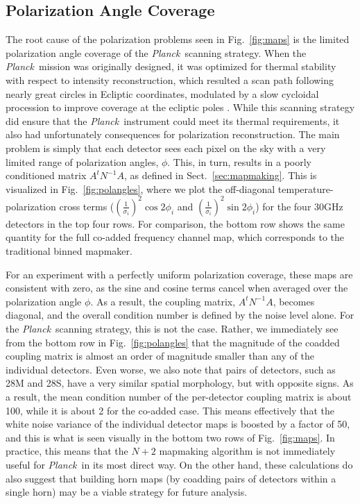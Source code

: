 \documentclass{aa}
\def\Planck{\textit{Planck}}
\begin{document}
\subsection{Polarization Angle Coverage}

The root cause of the polarization problems seen in Fig.~\ref{fig:maps} is the limited polarization angle coverage of the \Planck\ scanning strategy. When the \Planck\ mission was originally designed, it was optimized for thermal stability with respect to intensity reconstruction, which resulted a scan path following nearly great circles in Ecliptic coordinates, modulated by a slow cycloidal procession to improve coverage at the ecliptic poles \citep{planckScan}. While this scanning strategy did ensure that the \Planck\ instrument could meet its thermal requirements, it also had unfortunately consequences for polarization reconstruction. The main problem is simply that each detector sees each pixel on the sky with a very limited range of polarization angles, $\phi$. This, in turn, results in a poorly conditioned matrix $A^tN^{-1}A$, as defined in Sect.~\ref{sec:mapmaking}. This is visualized in Fig.~\ref{fig:polangles}, where we plot the off-diagonal temperature-polarization cross terms ($(\frac{1}{\sigma_i})^2 \cos2\phi_i$ and $(\frac{1}{\sigma_i})^2 \sin2\phi_i$) for the four 30GHz detectors in the top four rows. For comparison, the bottom row shows the same quantity for the full co-added frequency channel map, which corresponds to the traditional binned mapmaker. 

For an experiment with a perfectly uniform polarization coverage, these maps are consistent with zero, as the sine and cosine terms cancel when averaged over the polarization angle $\phi$. As a result, the coupling matrix, $A^tN^{-1}A$, becomes diagonal, and the overall condition number is defined by the noise level alone. For the \Planck\ scanning strategy, this is not the case. Rather, we immediately see from the bottom row in Fig.~\ref{fig:polangles} that the magnitude of the coadded coupling matrix is almost an order of magnitude smaller than any of the individual detectors. Even worse, we also note that pairs of detectors, such as 28M and 28S, have a very similar spatial morphology, but with opposite signs. As a result, the mean condition number of the per-detector coupling matrix is about 100, while it is about 2 for the co-added case. This means effectively that the white noise variance of the individual detector maps is boosted by a factor of 50, and this is what is seen visually in the bottom two rows of Fig.~\ref{fig:maps}. In practice, this means that the $N+2$ mapmaking algorithm is not immediately useful for \Planck\ in its most direct way. On the other hand, these calculations do also suggest that building horn maps (by coadding pairs of detectors within a single horn) may be a viable strategy for future analysis.
\end{document}
